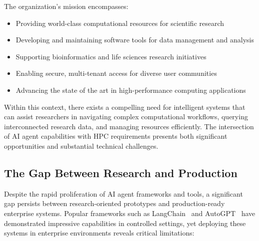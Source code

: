 \documentclass[a4paper,twoside]{sapthesis}
\begin{document}
The organization's mission encompasses:

\begin{itemize}
    \item Providing world-class computational resources for scientific research
    \item Developing and maintaining software tools for data management and analysis
    \item Supporting bioinformatics and life sciences research initiatives
    \item Enabling secure, multi-tenant access for diverse user communities
    \item Advancing the state of the art in high-performance computing applications
\end{itemize}

Within this context, there exists a compelling need for intelligent systems that can assist researchers in navigating complex computational workflows, querying interconnected research data, and managing resources efficiently. The intersection of AI agent capabilities with HPC requirements presents both significant opportunities and substantial technical challenges.

\subsection{The Gap Between Research and Production}

Despite the rapid proliferation of AI agent frameworks and tools, a significant gap persists between research-oriented prototypes and production-ready enterprise systems. Popular frameworks such as LangChain~\cite{langchain2023} and AutoGPT~\cite{significant2023autogpt} have demonstrated impressive capabilities in controlled settings, yet deploying these systems in enterprise environments reveals critical limitations:
\end{document}
